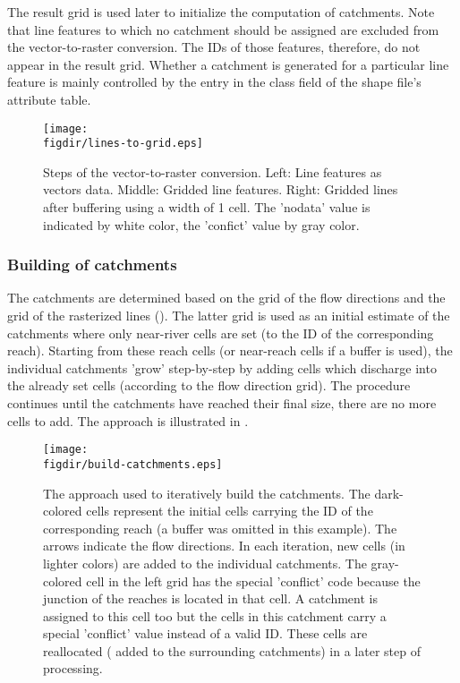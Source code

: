 The result grid is used later to initialize the computation of catchments. Note that line features to which no catchment should be assigned are excluded from the vector-to-raster conversion. The IDs of those features, therefore, do not appear in the result grid. Whether a catchment is generated for a particular line feature is mainly controlled by the entry in the class field of the shape file's attribute table.

\begin{figure}
  \centering
  \texttt{[image: \\figdir/lines-to-grid.eps]}
  \caption[Steps of the vector-to-raster conversion.]{Steps of the vector-to-raster conversion. Left: Line features as vectors data. Middle: Gridded line features. Right: Gridded lines after buffering using a width of 1 cell. The 'nodata' value is indicated by white color, the 'confict' value by gray color. \label{fig:lines-to-grid}}
\end{figure}

\subsubsection*{Building of catchments}
The catchments are determined based on the grid of the flow directions and the grid of the rasterized lines (). The latter grid is used as an initial estimate of the catchments where only near-river cells are set (to the ID of the corresponding reach). Starting from these reach cells (or near-reach cells if a buffer is used), the individual catchments 'grow' step-by-step by adding cells which discharge into the already set cells (according to the flow direction grid). The procedure continues until the catchments have reached their final size, \ie{} there are no more cells to add. The approach is illustrated in .

\begin{figure}
  \centering
  \texttt{[image: \\figdir/build-catchments.eps]}
  \caption[The approach used to iteratively build the catchments.]{The approach used to iteratively build the catchments. The dark-colored cells represent the initial cells carrying the ID of the corresponding reach (a buffer was omitted in this example). The arrows indicate the flow directions. In each iteration, new cells (in lighter colors) are added to the individual catchments. The gray-colored cell in the left grid has the special 'conflict' code because the junction of the reaches is located in that cell. A catchment is assigned to this cell too but the cells in this catchment carry a special 'conflict' value instead of a valid ID. These cells are reallocated (\ie{} added to the surrounding catchments) in a later step of processing. \label{fig:build-catchments}}
\end{figure}

